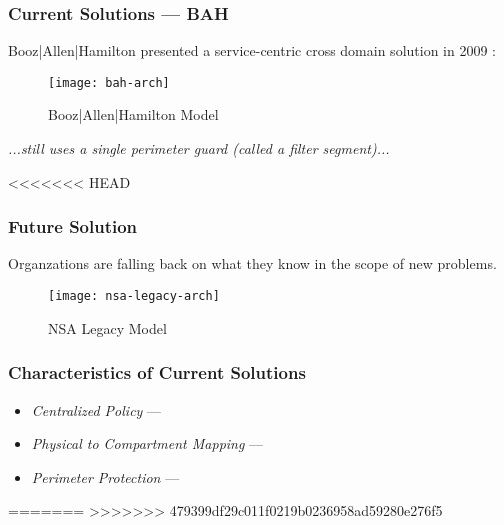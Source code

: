 \begin{frame}[t]
\frametitle{Current Solutions --- BAH}
Booz|Allen|Hamilton presented a service-centric cross domain solution in 2009 \cite{proposal:bah-arch}:
\begin{figure}[!t]
\centering
\texttt{[image: bah-arch]}
\caption{Booz|Allen|Hamilton Model}
\label{fig:model:conceptual-model}
\end{figure}
\textit{...still uses a single perimeter guard (called a filter segment)...}
\end{frame}

<<<<<<< HEAD
\begin{frame}[t]
\frametitle{Future Solution}
Organzations are falling back on what they know in the scope of new problems.
\begin{figure}[!t]
\centering
\texttt{[image: nsa-legacy-arch]}
\caption{NSA Legacy Model}
\label{fig:model:conceptual-model}
\end{figure}
\end{frame}

%
\begin{frame}
\frametitle{Characteristics of Current Solutions}
\begin{itemize}
\item<2-> \textit{Centralized Policy} ---
\item<3-> \textit{Physical to Compartment Mapping} ---
\item<4-> \textit{Perimeter Protection} ---
\end{itemize}
\end{frame}
=======
>>>>>>> 479399df29c011f0219b0236958ad59280e276f5
